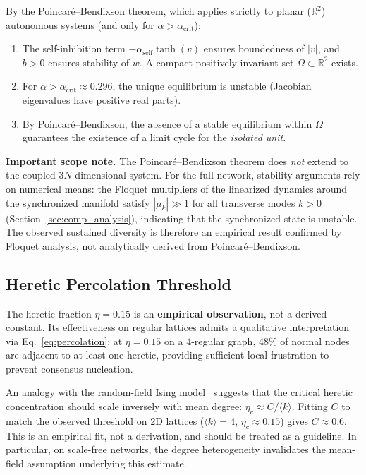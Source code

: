 \documentclass[11pt]{article}
\begin{document}
By the Poincar\'e--Bendixson theorem, which applies strictly to planar ($\mathbb{R}^2$) autonomous systems (and only for $\alpha > \alpha_{\text{crit}}$):
\begin{enumerate}
\item The self-inhibition term $-\alpha_{\text{self}} \tanh(v)$ ensures boundedness of $|v|$, and $b > 0$ ensures stability of $w$. A compact positively invariant set $\Omega \subset \mathbb{R}^2$ exists.
\item For $\alpha > \alpha_{\text{crit}} \approx 0.296$, the unique equilibrium is unstable (Jacobian eigenvalues have positive real parts).
\item By Poincar\'e--Bendixson, the absence of a stable equilibrium within $\Omega$ guarantees the existence of a limit cycle for the \emph{isolated unit}.
\end{enumerate}

\textbf{Important scope note.} The Poincar\'e--Bendixson theorem does \emph{not} extend to the coupled $3N$-dimensional system. For the full network, stability arguments rely on numerical means: the Floquet multipliers of the linearized dynamics around the synchronized manifold satisfy $|\mu_k| \gg 1$ for all transverse modes $k > 0$ (Section~\ref{sec:comp_analysis}), indicating that the synchronized state is unstable. The observed sustained diversity is therefore an empirical result confirmed by Floquet analysis, not analytically derived from Poincar\'e--Bendixson.


\subsection{Heretic Percolation Threshold}

The heretic fraction $\eta = 0.15$ is an \textbf{empirical observation}, not a derived constant. Its effectiveness on regular lattices admits a qualitative interpretation via Eq.~\ref{eq:percolation}: at $\eta = 0.15$ on a 4-regular graph, 48\% of normal nodes are adjacent to at least one heretic, providing sufficient local frustration to prevent consensus nucleation.

An analogy with the random-field Ising model~\cite{nattermann1998} suggests that the critical heretic concentration should scale inversely with mean degree: $\eta_c \approx C / \langle k \rangle$. Fitting $C$ to match the observed threshold on 2D lattices ($\langle k \rangle = 4$, $\eta_c \approx 0.15$) gives $C \approx 0.6$. This is an empirical fit, not a derivation, and should be treated as a guideline. In particular, on scale-free networks, the degree heterogeneity invalidates the mean-field assumption underlying this estimate.
\end{document}
